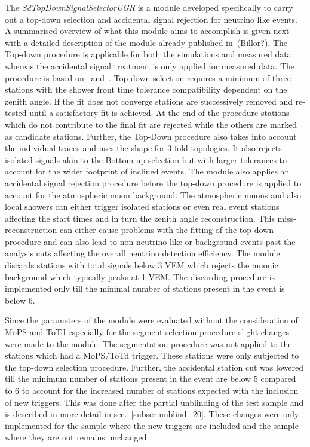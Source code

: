The \textit{SdTopDownSignalSelectorUGR} is a module developed specifically to carry out a top-down selection and accidental signal rejection for neutrino like events. A summarised overview of what this module aims to accomplish is given next with a detailed description of the module already published in~\cite{}(Billor?). The Top-down procedure is applicable for both the simulations and measured data whereas the accidental signal treatment is only applied for measured data. The procedure is based on~\cite{} and~\cite{}. Top-down selection requires a minimum of three stations with the shower front time tolerance compatibility dependent on the zenith angle. If the fit does not converge stations are successively removed and re-tested until a satisfactory fit is achieved. At the end of the procedure stations which do not contribute to the final fit are rejected while the others are marked as candidate stations. Further, the Top-Down procedure also takes into account the individual traces and uses the shape for 3-fold topologies. It also rejects isolated signals akin to the Bottom-up selection but with larger tolerances to account for the wider footprint of inclined events. The module also applies an accidental signal rejection procedure before the top-down procedure is applied to account for the atmospheric muon background. The atmospheric muons and also local showers can either trigger isolated stations or even real event stations affecting the start times and in turn the zenith angle reconstruction. This miss-reconstruction can either cause problems with the fitting of the top-down procedure and can also lead to non-neutrino like or background events past the analysis cuts affecting the overall neutrino detection efficiency. The module discards stations with total signals below 3 VEM which rejects the muonic background which typically peaks at 1 VEM. The discarding procedure is implemented only till the minimal number of stations present in the event is below 6.

Since the parameters of the module were evaluated without the consideration of MoPS and ToTd especially for the segment selection procedure slight changes were made to the module. The segmentation procedure was not applied to the stations which had a MoPS/ToTd trigger. These stations were only subjected to the top-down selection procedure. Further, the accidental station cut was lowered till the minimum number of stations present in the event are below 5 compared to 6 to account for the increased number of stations expected with the inclusion of new triggers. This was done after the partial unblinding of the test sample and is described in more detail in sec.~\ref{subsec:unblind_20}. These changes were only implemented for the sample where the new triggers are included and the sample where they are not remains unchanged. 

